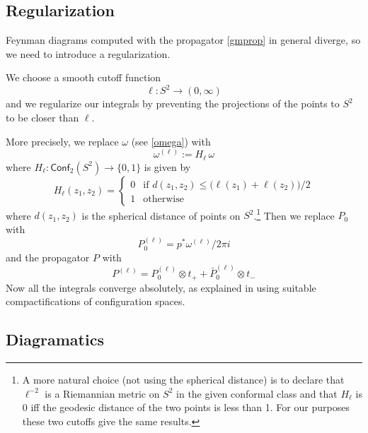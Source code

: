 \documentclass[a4paper]{amsart}
\theoremstyle{plain}
\theoremstyle{definition}
\newcommand{\g}{\mathfrak{g}}
\newcommand{\h}{\mathfrak{h}}
\newcommand{\cf}{\mathsf{Conf}}
\begin{document}

\subsection{Regularization}

 Feynman diagrams computed with the propagator \eqref{gmprop} in general diverge, so we need to introduce a regularization.

We choose a smooth cutoff function
$$\ell\colon S^2\to(0,\infty)$$ and  we regularize our integrals by preventing the projections of the points to $S^2$ to be closer than $\ell$.

More precisely, we replace $\omega$ (see \eqref{omega}) with
$$\omega^{(\ell)}:=H_\ell\, \omega$$
where $H_\ell\colon\cf_2(S^2)\to\{0,1\}$ is given by
$$
H_\ell(z_1,z_2)=
\begin{cases}
0 & \text{if } d(z_1,z_2)\leq \bigl(\ell(z_1)+\ell(z_2)\bigr)/2\\
1 & \text{otherwise}
\end{cases}
$$
where $d(z_1,z_2)$ is the spherical distance of points on $S^2$.\footnote{%
A more natural choice (not using the spherical distance) is to declare that $\ell^{-2}$ is a Riemannian metric on $S^2$ in the given conformal class and that $H_\ell$ is 0 iff the geodesic distance of the two points is less than 1. For our purposes these two cutoffs give the same results.}
Then we replace $P_0$ with
$$P_0^{(\ell)}=p^*\omega^{(\ell)}/2\pi i$$
and the propagator $P$ with
$$P^{(\ell)}=P_0^{(\ell)}\otimes t_+ + \bar P_0^{(\ell)}\otimes t_-$$
 Now all the integrals converge absolutely, as explained in \cite{AS,K} using suitable compactifications of configuration spaces.

\subsection{Diagramatics}

\end{document}
